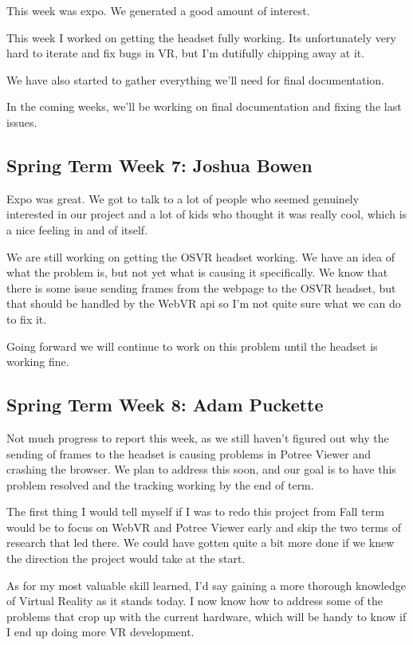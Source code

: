 \documentclass[draftclsnofoot,onecolumn]{IEEEtran}
\begin{document}
This week was expo. We generated a good amount of interest.

This week I worked on getting the headset fully working. Its unfortunately very hard to iterate and fix bugs in VR, but I'm dutifully chipping away at it.

We have also started to gather everything we'll need for final documentation.

In the coming weeks, we'll be working on final documentation and fixing the last issues.

\subsection{Spring Term Week 7: Joshua Bowen}

Expo was great. We got to talk to a lot of people who seemed genuinely interested in our project and a lot of kids who thought it was really cool, which is a nice feeling in and of itself.

We are still working on getting the OSVR headset working. We have an idea of what the problem is, but not yet what is causing it specifically. We know that there is some issue sending frames from the webpage to the OSVR headset, but that should be handled by the WebVR api so I'm not quite sure what we can do to fix it.

Going forward we will continue to work on this problem until the headset is working fine.

\subsection{Spring Term Week 8: Adam Puckette}

Not much progress to report this week, as we still haven't figured out why the sending of frames to the headset is causing problems in Potree Viewer and crashing the browser. We plan to address this soon, and our goal is to have this problem resolved and the tracking working by the end of term.

The first thing I would tell myself if I was to redo this project from Fall term would be to focus on WebVR and Potree Viewer early and skip the two terms of research that led there. We could have gotten quite a bit more done if we knew the direction the project would take at the start.

As for my most valuable skill learned, I'd say gaining a more thorough knowledge of Virtual Reality as it stands today. I now know how to address some of the problems that crop up with the current hardware, which will be handy to know if I end up doing more VR development.
\end{document}
